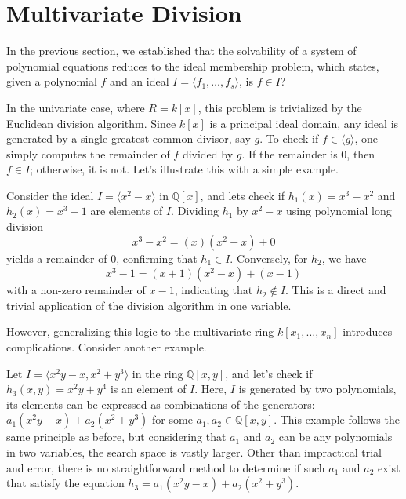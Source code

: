 \section{Multivariate Division}

In the previous section, we established that the solvability of a system of polynomial equations reduces to the ideal membership problem, which states, given a polynomial $f$ and an ideal $I = \langle f_1, \dots, f_s \rangle$, is $f \in I$?

In the univariate case, where $R = k[x]$, this problem is trivialized by the Euclidean division algorithm. Since $k[x]$ is a principal ideal domain, any ideal is generated by a single greatest common divisor, say $g$. To check if $f \in \langle g \rangle$, one simply computes the remainder of $f$ divided by $g$. If the remainder is $0$, then $f \in I$; otherwise, it is not. Let's illustrate this with a simple example.

\begin{example}
\label{ex:univar_membership}
Consider the ideal $I = \langle x^2 - x \rangle$ in $\mathbb{Q}[x]$, and lets check if $h_1(x) = x^3 - x^2$ and $h_2(x) = x^3 - 1$ are elements of $I$. Dividing $h_1$ by $x^2 - x$ using polynomial long division 
$$
x^3 - x^2 = (x)(x^2 - x) + 0
$$
yields a remainder of $0$, confirming that $h_1 \in I$. Conversely, for $h_2$, we have
$$
x^3 - 1 = (x + 1)(x^2 - x) + (x - 1)
$$
with a non-zero remainder of $x - 1$, indicating that $h_2 \notin I$. This is a direct and trivial application of the division algorithm in one variable.
\end{example}

However, generalizing this logic to the multivariate ring $k[x_1, \dots, x_n]$ introduces complications. Consider another example.

\begin{example} 
\label{ex:multivar_membership}
Let $I = \langle x^2 y - x, x^2 + y^3 \rangle$ in the ring $\mathbb{Q}[x, y]$, and let's check if $h_3(x, y) = x^2y + y^4$ is an element of $I$. Here, $I$ is generated by two polynomials, its elements can be expressed as combinations of the generators: $a_1(x^2 y - x) + a_2(x^2 + y^3)$ for some $a_1, a_2 \in \mathbb{Q}[x, y]$. This example follows the same principle as before, but considering that $a_1$ and $a_2$ can be any polynomials in two variables, the search space is vastly larger. Other than impractical trial and error, there is no straightforward method to determine if such $a_1$ and $a_2$ exist that satisfy the equation $h_3 = a_1(x^2 y - x) + a_2(x^2 + y^3)$.
\end{example}

